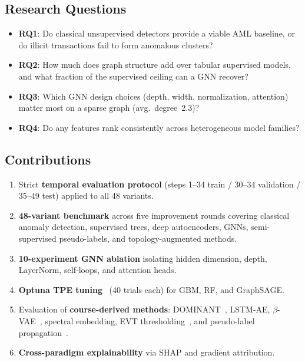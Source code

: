 \documentclass[conference]{IEEEtran}
\begin{document}
\subsection{Research Questions}
\begin{itemize}
  \item \textbf{RQ1}: Do classical unsupervised detectors provide a viable AML
        baseline, or do illicit transactions fail to form anomalous clusters?
  \item \textbf{RQ2}: How much does graph structure add over tabular supervised
        models, and what fraction of the supervised ceiling can a GNN recover?
  \item \textbf{RQ3}: Which GNN design choices (depth, width, normalization,
        attention) matter most on a sparse graph (avg.\ degree~2.3)?
  \item \textbf{RQ4}: Do any features rank consistently across heterogeneous
        model families?
\end{itemize}

\subsection{Contributions}
\begin{enumerate}
  \item Strict \textbf{temporal evaluation protocol} (steps 1--34 train /
        30--34 validation / 35--49 test) applied to all 48 variants.
  \item \textbf{48-variant benchmark} across five improvement rounds covering
        classical anomaly detection, supervised trees, deep autoencoders, GNNs,
        semi-supervised pseudo-labels, and topology-augmented methods.
  \item \textbf{10-experiment GNN ablation} isolating hidden dimension, depth,
        LayerNorm, self-loops, and attention heads.
  \item \textbf{Optuna TPE tuning}~\cite{akiba2019} (40 trials each) for GBM,
        RF, and GraphSAGE.
  \item Evaluation of \textbf{course-derived methods}: DOMINANT~\cite{ding2019dominant},
        LSTM-AE, $\beta$-VAE~\cite{higgins2017beta}, spectral embedding, EVT
        thresholding~\cite{siffer2017}, and pseudo-label propagation~\cite{lee2013pseudo}.
  \item \textbf{Cross-paradigm explainability} via SHAP and gradient attribution.
\end{enumerate}

\end{document}

